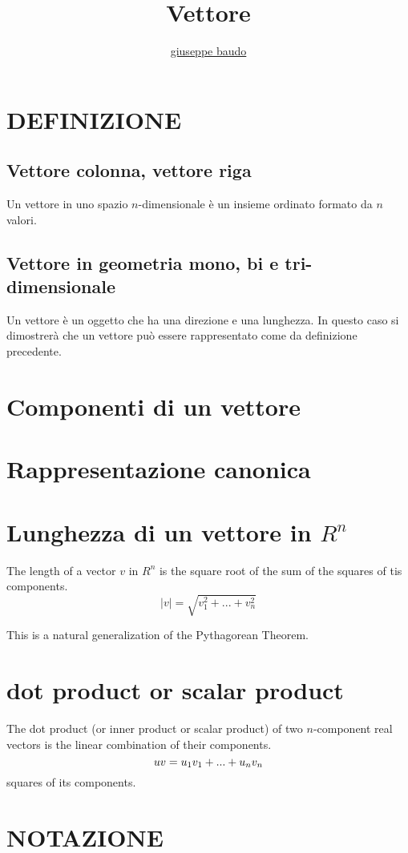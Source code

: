 \documentclass[a4paper,10pt]{article}
\title{Vettore}
\author{\href{http://www.baudo.hol.es}{giuseppe baudo}}
\begin{document}
\maketitle

\section{DEFINIZIONE}
\subsection{Vettore colonna, vettore riga}
Un vettore in uno spazio $n$-dimensionale è un insieme ordinato formato da $n$ valori. 

\subsection{Vettore in geometria mono, bi e tri-dimensionale}
Un vettore è un oggetto che ha una direzione e una lunghezza. In questo caso si dimostrerà che un vettore può essere
rappresentato come da definizione precedente.

\section{Componenti di un vettore}

\section{Rappresentazione canonica}

\section{Lunghezza di un vettore in $R^n$}
The length of a vector $v$ in $R^n$ is the square root of the sum of the squares of tis components.
\[
 |v|=\sqrt{v^2_1+...+v^2_n}
\]

This is a natural generalization of the Pythagorean Theorem.

\section{dot product or scalar product}
The dot product (or inner product or scalar product) of two $n$-component real vectors is the linear combination of their components.
\[
 u \dotfill v = u_1v_1+...+u_nv_n
\]
squares of its components.


\section{NOTAZIONE}
\end{document}
